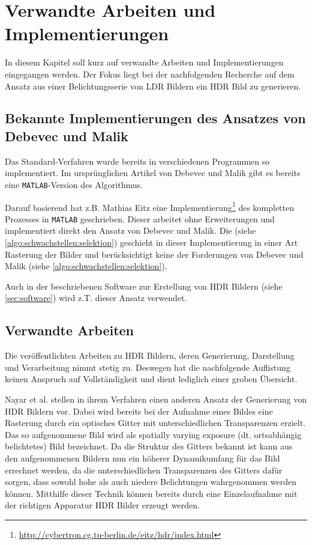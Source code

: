 \chapter{Verwandte Arbeiten und Implementierungen}
\label{chap:references}

In diesem Kapitel soll kurz auf verwandte Arbeiten und Implementierungen eingegangen werden. Der Fokus liegt bei der nachfolgenden Recherche auf dem Ansatz aus einer Belichtungsserie von \gls{LDR} Bildern ein \gls{HDR} Bild zu generieren.

\section{Bekannte Implementierungen des Ansatzes von Debevec und Malik}
Das Standard-Verfahren wurde bereits in verschiedenen Programmen so implementiert. Im ursprünglichen Artikel von Debevec und Malik gibt es bereits eine \texttt{MATLAB}-Version des Algorithmus. 

Darauf basierend hat z.B. Mathias Eitz eine Implementierung\footnote{\url{http://cybertron.cg.tu-berlin.de/eitz/hdr/index.html}} des kompletten Prozesses in \texttt{MATLAB} geschrieben. Dieser arbeitet ohne Erweiterungen und implementiert direkt den Ansatz von Debevec und Malik. Die  (siehe \autoref{algo:schwachstellen:selektion}) geschieht in dieser Implementierung in einer Art Rasterung der Bilder und berücksichtigt keine der Forderungen von Debevec und Malik (siehe \autoref{algo:schwachstellen:selektion}). 

Auch in der beschriebenen Software zur Erstellung von \gls{HDR} Bildern (siehe \autoref{sec:software}) wird z.T. dieser Ansatz verwendet.


\section{Verwandte Arbeiten}

Die veröffentlichten Arbeiten zu \gls{HDR} Bildern, deren Generierung, Darstellung und Verarbeitung nimmt stetig zu. Deswegen hat die nachfolgende Auflistung keinen Anspruch auf Vollständigkeit und dient lediglich einer groben Übersicht.

Nayar et al. \cite{Nayar00highdynamic} stellen in ihrem Verfahren einen anderen Ansatz der Generierung von \gls{HDR} Bildern vor. Dabei wird bereits bei der Aufnahme eines Bildes eine Rasterung durch ein optisches Gitter mit unterschiedlichen Transparenzen erzielt. Das so aufgenommene Bild wird als spatially varying exposure (dt. ortsabhängig belichtetes) Bild bezeichnet. Da die Struktur des Gitters bekannt ist kann aus den aufgenommenen Bildern nun ein höherer Dynamikumfang für das Bild errechnet werden, da die unterschiedlichen Transparenzen des Gitters dafür sorgen, dass sowohl hohe als auch niedere Belichtungen wahrgenommen werden können. Mitthilfe dieser Technik können bereits durch eine Einzelaufnahme mit der richtigen Apparatur HDR Bilder erzeugt werden.

